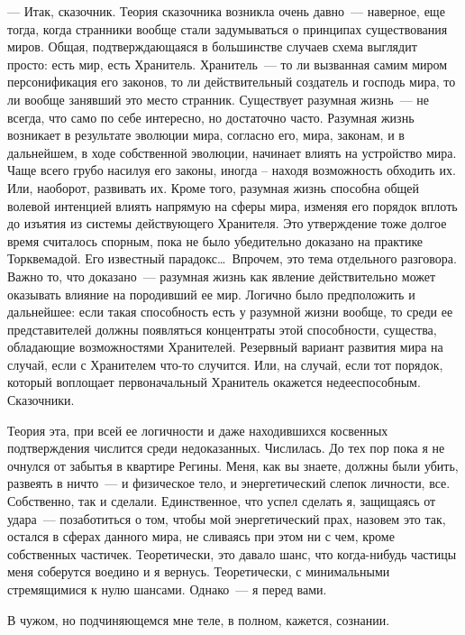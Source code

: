 \noindent --- Итак, сказочник. Теория сказочника возникла очень давно~--- наверное, еще 
тогда, когда странники вообще стали задумываться о принципах существования миров. 
Общая, подтверждающаяся в большинстве случаев схема выглядит просто: есть мир, 
есть Хранитель. Хранитель~--- то ли вызванная самим миром персонификация его 
законов, то ли действительный создатель и господь мира, то ли вообще занявший 
это место странник. Существует разумная жизнь~--- не всегда, что само по себе 
интересно, но достаточно часто. Разумная жизнь возникает в результате эволюции 
мира, согласно его, мира, законам, и в дальнейшем, в ходе собственной эволюции, 
начинает влиять на устройство мира. Чаще всего грубо насилуя его законы, иногда 
– находя возможность обходить их. Или, наоборот, развивать их. Кроме того, 
разумная жизнь способна общей волевой интенцией влиять напрямую на сферы мира, 
изменяя его порядок вплоть до изъятия из системы действующего Хранителя. Это 
утверждение тоже долгое время считалось спорным, пока не было убедительно 
доказано на практике Торквемадой. Его известный парадокс\ldots\ Впрочем, это 
тема отдельного разговора. Важно то, что доказано~--- разумная жизнь как явление 
действительно может оказывать влияние на породивший ее мир. Логично было 
предположить и дальнейшее: если такая способность есть у разумной жизни вообще, 
то среди ее представителей должны появляться концентраты этой способности, 
существа, обладающие возможностями Хранителей. Резервный вариант развития мира 
на случай, если с Хранителем что-то случится. Или, на случай, если тот порядок, 
который воплощает первоначальный Хранитель окажется недееспособным. Сказочники.

Теория эта, при всей ее логичности и даже находившихся косвенных подтверждения 
числится среди недоказанных. Числилась. До тех пор пока я не очнулся от забытья 
в квартире Регины. Меня, как вы знаете, должны были убить, развеять в ничто~--- 
и физическое тело, и энергетический слепок личности, все. Собственно, так и 
сделали. Единственное, что успел сделать я, защищаясь от удара~--- позаботиться 
о том, чтобы мой энергетический прах, назовем это так, остался в сферах данного 
мира, не сливаясь при этом ни с чем, кроме собственных частичек. Теоретически, 
это давало шанс, что когда-нибудь частицы меня соберутся воедино и я вернусь. 
Теоретически, с минимальными стремящимися к нулю шансами. Однако~--- я перед 
вами. 

В чужом, но подчиняющемся мне теле, в полном, кажется, сознании.

